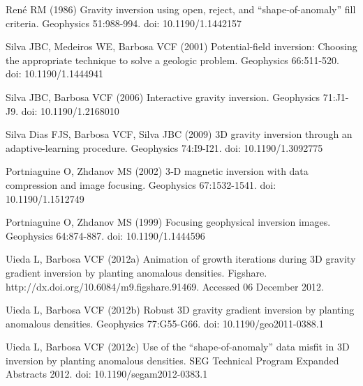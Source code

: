 \documentclass[twocolumn,draft]{svjour3}
\begin{document}
\begin{thebibliography}{}
Ren\'e RM (1986)
Gravity inversion using open, reject, and ``shape-of-anomaly'' fill criteria.
Geophysics 51:988-994. doi: 10.1190/1.1442157

Silva JBC, Medeiros WE, Barbosa VCF (2001)
Potential-field inversion: Choosing the appropriate technique to solve a
geologic problem. Geophysics 66:511-520. doi: 10.1190/1.1444941

Silva JBC, Barbosa VCF (2006)
Interactive gravity inversion. Geophysics 71:J1-J9. doi: 10.1190/1.2168010

Silva Dias FJS, Barbosa VCF, Silva JBC (2009)
3D gravity inversion through an adaptive-learning procedure.
Geophysics 74:I9-I21. doi: 10.1190/1.3092775

Portniaguine O, Zhdanov MS (2002)
3‐D magnetic inversion with data compression and image focusing.
Geophysics 67:1532-1541. doi: 10.1190/1.1512749

Portniaguine O, Zhdanov MS (1999)
Focusing geophysical inversion images. Geophysics 64:874-887.
doi: 10.1190/1.1444596

Uieda L, Barbosa VCF (2012a)
Animation of growth iterations during 3D gravity gradient inversion by planting
anomalous densities. Figshare. http://dx.doi.org/10.6084/m9.figshare.91469.
Accessed 06 December 2012.

Uieda L, Barbosa VCF (2012b)
Robust 3D gravity gradient inversion by planting anomalous densities.
Geophysics 77:G55-G66. doi: 10.1190/geo2011-0388.1

Uieda L, Barbosa VCF (2012c)
Use of the ``shape-of-anomaly'' data misfit in 3D inversion by planting
anomalous densities. SEG Technical Program Expanded Abstracts 2012.
doi: 10.1190/segam2012-0383.1

\end{thebibliography}
\end{document}
